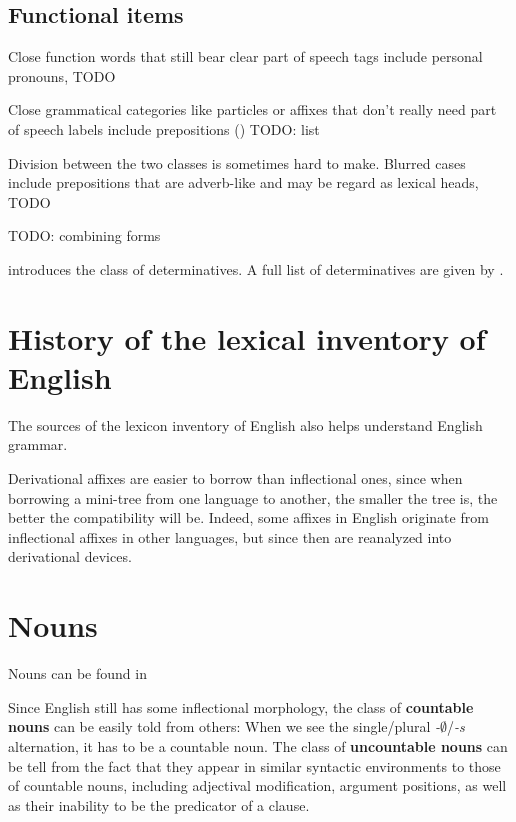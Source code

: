 \documentclass[UTF8, a4paper, oneside, scheme=plain, 12pt]{ctexbook}
\newcommand*{\citepage}[1]{p.~{#1}}
\newcommand*{\concept}[1]{\textbf{#1}}
\newcommand{\form}[1]{\emph{#1}}
\newcommand{\emptymorpheme}{$\emptyset$}
\begin{document}
\subsection{Functional items}

Close function words that still bear clear part of speech tags  
include personal pronouns, TODO

Close grammatical categories like particles or affixes that don't really need part of speech labels
include prepositions () TODO: list

Division between the two classes 
is sometimes hard to make.
Blurred cases include 
prepositions that are adverb-like and may be regard as lexical heads, TODO

TODO: combining forms \citep[\citepage{1661}]{cgel}


\citet[\citepage{330}]{cgel} introduces the class of determinatives.
A full list of determinatives are given by \citet[\citepage{356}]{cgel}.

\section{History of the lexical inventory of English}\label{sec:pos.inventory}

The sources of the lexicon inventory of English 
also helps understand English grammar.


Derivational affixes are easier to borrow than inflectional ones, 
since when borrowing a mini-tree from one language to another, 
the smaller the tree is, 
the better the compatibility will be. 
Indeed, some affixes in English originate from inflectional affixes in other languages, 
but since then are reanalyzed into derivational devices.

\section{Nouns}\label{sec:pos.noun}

Nouns can be found in 

Since English still has some inflectional morphology,
the class of \concept{countable nouns} can be easily told from others:
When we see the single/plural \form{-\emptymorpheme}/\form{-s} alternation, 
it has to be a countable noun.
The class of \concept{uncountable nouns} can be tell from 
the fact that they appear in similar syntactic environments 
to those of countable nouns,
including adjectival modification,
argument positions,
as well as their inability to be the predicator of a clause.
\end{document}
